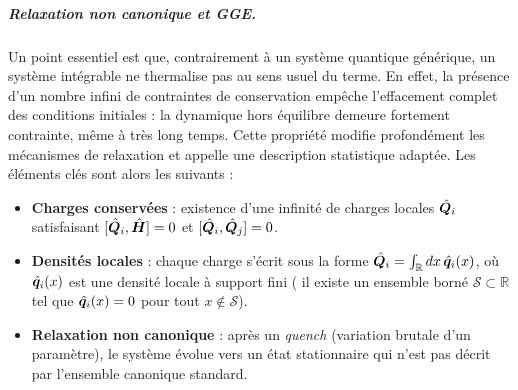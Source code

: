 \subparagraph{Relaxation non canonique et \gls{GGE}.}

Un point essentiel est que, contrairement à un système quantique générique, un système intégrable ne thermalise pas au sens usuel du terme. En effet, la présence d’un nombre infini de contraintes de conservation empêche l’effacement complet des conditions initiales : la dynamique hors équilibre demeure fortement contrainte, même à très long temps. Cette propriété modifie profondément les mécanismes de relaxation et appelle une description statistique adaptée. Les éléments clés sont alors les suivants :


\begin{itemize}[label = $\bullet$]
    \item {\bf Charges conservées} : existence d’une infinité de charges locales $\hat{\bm{Q}}_i$ satisfaisant $[\hat{\bm{Q}}_i , \hat{\bm{H}}] = 0$ et $[\hat{\bm{Q}}_i , \hat{\bm{Q}}_j] = 0$.
    
    \item {\bf Densités locales} : chaque charge s’écrit sous la forme $\hat{\bm{Q}}_i = \int_{\mathbb{R}} dx\, \hat{\bm{q}}_i(x)$, où $\hat{\bm{q}}_i(x)$ est une densité locale à support fini (\ie{} il existe un ensemble borné $\mathcal{S} \subset \mathbb{R}$ tel que $\hat{\bm{q}}_i(x)=0$ pour tout $x \notin \mathcal{S}$).
    
    \item {\bf Relaxation non canonique} : après un {\em quench} (variation brutale d’un paramètre), le système évolue vers un état stationnaire qui n’est pas décrit par l’ensemble canonique standard.
\end{itemize}


